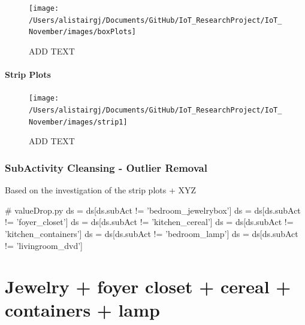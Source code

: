 \documentclass[11pt,]{article}
\newenvironment{Shaded}{\begin{snugshade}}{\end{snugshade}}
\newcommand{\CommentTok}[1]{\textcolor[rgb]{0.54,0.53,0.53}{#1}}
\newcommand{\NormalTok}[1]{\textcolor[rgb]{0.12,0.11,0.11}{#1}}
\newcommand{\OperatorTok}[1]{\textcolor[rgb]{0.12,0.11,0.11}{#1}}
\newcommand{\StringTok}[1]{\textcolor[rgb]{0.75,0.01,0.01}{#1}}
\let\oldparagraph\paragraph
\renewcommand{\paragraph}[1]{\oldparagraph{#1}\mbox{}}
\begin{document}
\begin{figure}[H]
\texttt{[image: /Users/alistairgj/Documents/GitHub/IoT\_ResearchProject/IoT\_November/images/boxPlots]} \caption{ADD TEXT}\label{fig:unnamed-chunk-19}
\end{figure}

\hypertarget{strip-plots}{%
\paragraph{Strip Plots}\label{strip-plots}}

\begin{figure}[H]
\texttt{[image: /Users/alistairgj/Documents/GitHub/IoT\_ResearchProject/IoT\_November/images/strip1]} \caption{ADD TEXT}\label{fig:unnamed-chunk-20}
\end{figure}

\hypertarget{subactivity-cleansing---outlier-removal}{%
\subsubsection{SubActivity Cleansing - Outlier
Removal}\label{subactivity-cleansing---outlier-removal}}

Based on the investigation of the strip plots + XYZ

\begin{Shaded}
\begin{Highlighting}[]
\CommentTok{# valueDrop.py}
\NormalTok{ds }\OperatorTok{=}\NormalTok{ ds[ds.subAct }\OperatorTok{!=} \StringTok{'bedroom_jewelrybox'}\NormalTok{]}
\NormalTok{ds }\OperatorTok{=}\NormalTok{ ds[ds.subAct }\OperatorTok{!=} \StringTok{'foyer_closet'}\NormalTok{]}
\NormalTok{ds }\OperatorTok{=}\NormalTok{ ds[ds.subAct }\OperatorTok{!=} \StringTok{'kitchen_cereal'}\NormalTok{]}
\NormalTok{ds }\OperatorTok{=}\NormalTok{ ds[ds.subAct }\OperatorTok{!=} \StringTok{'kitchen_containers'}\NormalTok{]}
\NormalTok{ds }\OperatorTok{=}\NormalTok{ ds[ds.subAct }\OperatorTok{!=} \StringTok{'bedroom_lamp'}\NormalTok{]}
\NormalTok{ds }\OperatorTok{=}\NormalTok{ ds[ds.subAct }\OperatorTok{!=} \StringTok{'livingroom_dvd'}\NormalTok{]}
\end{Highlighting}
\end{Shaded}

\hypertarget{jewelry-foyer-closet-cereal-containers-lamp}{%
\section{Jewelry + foyer closet + cereal + containers +
lamp}\label{jewelry-foyer-closet-cereal-containers-lamp}}
\end{document}
